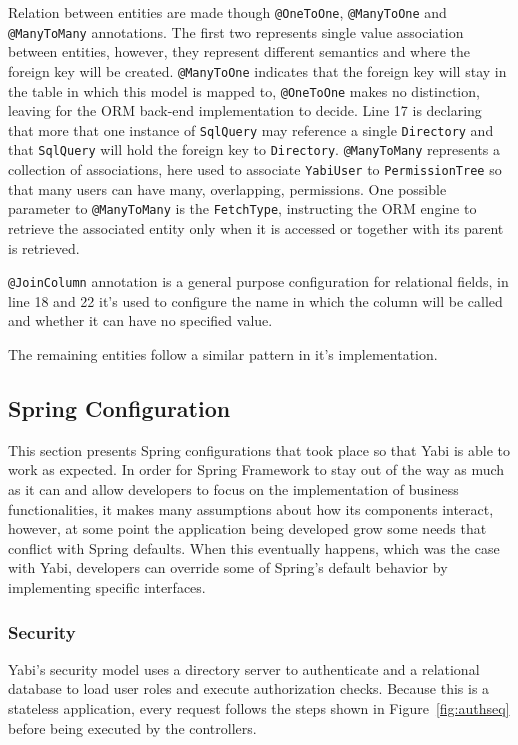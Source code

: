 Relation between entities are made though \texttt{@OneToOne}, \texttt{@ManyToOne} and \texttt{@ManyToMany} annotations.
The first two represents single value association between entities, however, they represent different semantics and where the foreign key will be created.
\texttt{@ManyToOne} indicates that the foreign key will stay in the table in which this model is mapped to, \texttt{@OneToOne} makes no distinction, leaving for the \gls{ORM} back-end implementation to decide.
Line 17 is declaring that more that one instance of \texttt{SqlQuery} may reference a single \texttt{Directory} and that \texttt{SqlQuery} will hold the foreign key to \texttt{Directory}.
\texttt{@ManyToMany} represents a collection of associations, here used to associate \texttt{YabiUser} to \texttt{PermissionTree} so that many users can have many, overlapping, permissions. One possible parameter to \texttt{@ManyToMany} is the \texttt{FetchType}, instructing the \gls{ORM} engine to retrieve the associated entity only when it is accessed or together with its parent is retrieved.

\texttt{@JoinColumn} annotation is a general purpose configuration for relational fields, in line 18 and 22 it's used to configure the name in which the column will be called and whether it can have no specified value.



The remaining entities follow a similar pattern in it's implementation.

\subsection{Spring Configuration}
This section presents Spring configurations that took place so that \gls{Yabi} is able to work as expected. In order for Spring Framework to stay out of the way as much as it can and allow developers to focus on the implementation of business functionalities, it makes many assumptions about how its components interact, however, at some point the application being developed grow some needs that conflict with Spring defaults. When this eventually happens, which was the case with \gls{Yabi}, developers can override some of Spring's default behavior by implementing specific interfaces.



\subsubsection{Security}
\gls{Yabi}'s security model uses a directory server to authenticate and a relational database to load user roles and execute authorization checks. Because this is a stateless application, every request follows the steps shown in Figure~\ref{fig:authseq} before being executed by the controllers.

